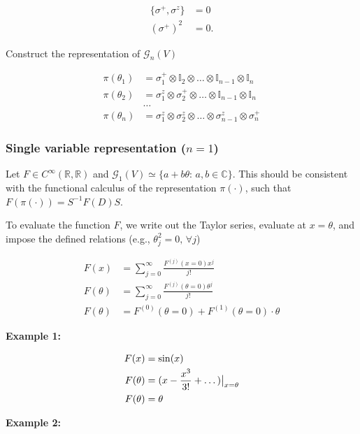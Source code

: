 \begin{align}
\{ \sigma^+ , \sigma^z \} &= 0 \\
(\sigma^+ )^2 &= 0.
\end{align}

\noindent Construct the representation of $\mathcal{G}_n (V)$

\begin{align}
\pi (\theta_1 ) &= \sigma_1^+ \otimes \mathbb{I}_2 \otimes \dots \otimes \mathbb{I}_{n-1} \otimes \mathbb{I}_n \\
\pi (\theta_2 ) &= \sigma_1^z \otimes \sigma_2^+ \otimes \dots \otimes \mathbb{I}_{n-1} \otimes \mathbb{I}_n \\ 
&\dots \\
\pi (\theta_n) &= \sigma_1^z \otimes \sigma_2^z \otimes \dots \otimes \sigma_{n-1}^z \otimes \sigma_n^+
\end{align}

\subsubsection*{Single variable representation ($n=1$)}

\noindent Let $F \in C^\infty (\mathbb{R}, \mathbb{R})$ and $\mathcal{G}_1 (V) \simeq \{ a+b \theta : \, a,b \in \mathbb{C} \}$. This should be consistent with the functional calculus of the representation $\pi(\cdot)$, such that $F(\pi(\cdot)) = S^{-1} F(D) S$. 

\noindent To evaluate the function $F$, we write out the Taylor series, evaluate at $x=\theta$, and impose the defined relations (e.g., $\theta_j^2 = 0, \, \forall j$)

\begin{align}
F(x) &= \sum_{j=0}^\infty \frac{F^{(j)} (x=0) x^j}{j!} \\
F(\theta) &= \sum_{j=0}^\infty \frac{F^{(j)} (\theta=0) \theta^j}{j!} \\
F(\theta) &= F^{(0)} (\theta=0) + F^{(1)} (\theta=0) \cdot \theta
\end{align}

\textbf{Example 1:}

\begin{align}
F(x) &= \sin(x) \\
F(\theta) &= (x - \frac{x^3}{3!} + \dots ) \big{|}_{x=\theta} \\
F(\theta) &= \theta
\end{align}

\textbf{Example 2: }

